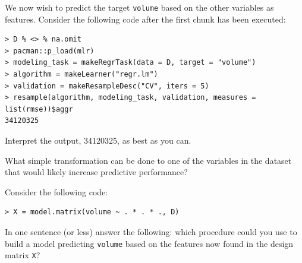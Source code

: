 \documentclass[12pt]{article}
\begin{document}
We now wish to predict the target \texttt{volume} based on the other variables as features. Consider the following code after the first chunk has been executed:

\begin{lstlisting}
> D % <> % na.omit
> pacman::p_load(mlr)  
> modeling_task = makeRegrTask(data = D, target = "volume")
> algorithm = makeLearner("regr.lm")
> validation = makeResampleDesc("CV", iters = 5)
> resample(algorithm, modeling_task, validation, measures = list(rmse))$aggr
34120325
\end{lstlisting}

 Interpret the output, 34120325, as best as you can. 

 What simple transformation can be done to one of the variables in the dataset that would likely increase predictive performance?

Consider the following code:

\begin{lstlisting}
> X = model.matrix(volume ~ . * . * ., D)
\end{lstlisting}


 In one sentence (or less) answer the following: which procedure could you use to build a model predicting \texttt{volume} based on the features now found in the design matrix \texttt{X}?
\eenum
\end{document}
